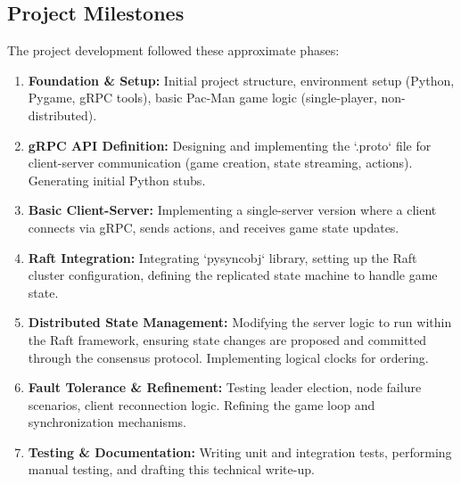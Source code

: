 \documentclass[11pt]{article}
\begin{document}
\subsection{Project Milestones}
The project development followed these approximate phases:
\begin{enumerate}
    \item \textbf{Foundation \& Setup:} Initial project structure, environment setup (Python, Pygame, gRPC tools), basic Pac-Man game logic (single-player, non-distributed).
    \item \textbf{gRPC API Definition:} Designing and implementing the `.proto` file for client-server communication (game creation, state streaming, actions). Generating initial Python stubs.
    \item \textbf{Basic Client-Server:} Implementing a single-server version where a client connects via gRPC, sends actions, and receives game state updates.
    \item \textbf{Raft Integration:} Integrating `pysyncobj` library, setting up the Raft cluster configuration, defining the replicated state machine to handle game state.
    \item \textbf{Distributed State Management:} Modifying the server logic to run within the Raft framework, ensuring state changes are proposed and committed through the consensus protocol. Implementing logical clocks for ordering.
    \item \textbf{Fault Tolerance \& Refinement:} Testing leader election, node failure scenarios, client reconnection logic. Refining the game loop and synchronization mechanisms.
    \item \textbf{Testing \& Documentation:} Writing unit and integration tests, performing manual testing, and drafting this technical write-up.
\end{enumerate}
\end{document}
